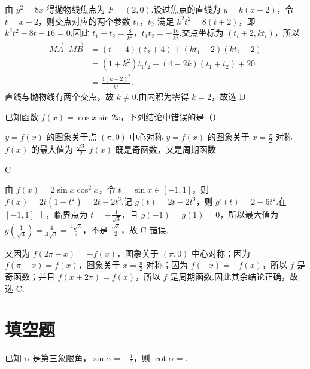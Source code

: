 \begin{solution}
由 \(y^2=8x\) 得抛物线焦点为 \(F=(2,0)\).设过焦点的直线为 \(y=k(x-2)\)，令 \(t=x-2\)，则交点对应的两个参数 \(t_1\)，\(t_2\) 满足 \(k^2t^2=8(t+2)\)，即 \(k^2t^2-8t-16=0\).因此 \(t_1+t_2=\frac{8}{k^2}\)，\(t_1t_2=-\frac{16}{k^2}\).交点坐标为 \((t_i+2,kt_i)\)，所以
\[
\begin{aligned}
\overrightarrow{MA}\cdot\overrightarrow{MB}
&=(t_1+4)(t_2+4)+(kt_1-2)(kt_2-2)\\
&=(1+k^2)t_1t_2+(4-2k)(t_1+t_2)+20\\
&=\frac{4(k-2)^2}{k^2}.
\end{aligned}
\]
直线与抛物线有两个交点，故 \(k\neq0\).由内积为零得 \(k=2\)，故选 D.
\end{solution}

\begin{problem}
已知函数 \(f(x)=\cos x\sin 2x\)，下列结论中错误的是（\quad）

\choices
    {\(y=f(x)\) 的图象关于点 \((\pi,0)\) 中心对称}
    {\(y=f(x)\) 的图象关于 \(x=\frac{\pi}{2}\) 对称}
    {\(f(x)\) 的最大值为 \(\frac{\sqrt{3}}{2}\)}
    {\(f(x)\) 既是奇函数，又是周期函数}
\end{problem}

\begin{answer}
C
\end{answer}

\begin{solution}
由 \(f(x)=2\sin x\cos^2x\)，令 \(t=\sin x\in[-1,1]\)，则 \(f(x)=2t(1-t^2)=2t-2t^3\).记 \(g(t)=2t-2t^3\)，则 \(g'(t)=2-6t^2\).在 \([-1,1]\) 上，临界点为 \(t=\pm\frac{1}{\sqrt3}\)，且 \(g(-1)=g(1)=0\)，所以最大值为 \(g\left(\frac{1}{\sqrt3}\right)=\frac{4}{3\sqrt3}=\frac{4\sqrt3}{9}\)，不是 \(\frac{\sqrt3}{2}\)，故 C 错误.

又因为 \(f(2\pi-x)=-f(x)\)，图象关于 \((\pi,0)\) 中心对称；因为 \(f(\pi-x)=f(x)\)，图象关于 \(x=\frac{\pi}{2}\) 对称；因为 \(f(-x)=-f(x)\)，所以 \(f\) 是奇函数；并且 \(f(x+2\pi)=f(x)\)，所以 \(f\) 是周期函数.因此其余结论正确，故选 C.
\end{solution}

\section{填空题}

\begin{problem}
已知 \(\alpha\) 是第三象限角，\(\sin\alpha=-\frac{1}{3}\)，则 \(\cot\alpha=\)\fillinblank{}.
\end{problem}

